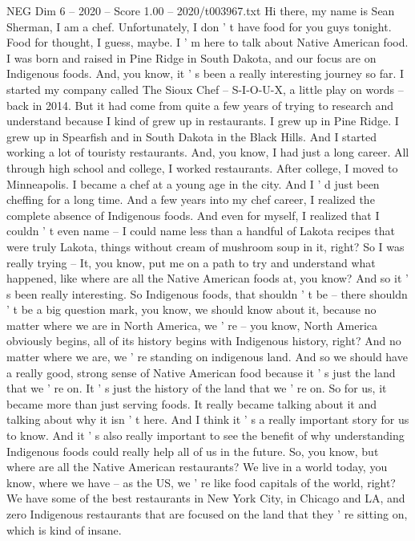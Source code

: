 \begin{textsample}{NEG Dim 6 – 2020 – Score 1.00 – 2020/t003967.txt}  \label{ex:f6_neg_024}
Hi there, my name is Sean Sherman, I am a chef.
Unfortunately, I don ' t have food for you guys tonight.
Food for thought, I guess, maybe.
I ' m here to talk about Native American food.
I was born and raised in Pine Ridge in South Dakota, and our focus are on Indigenous foods.
And, you know, it ' s been a really interesting journey so far.
I started my company called The Sioux Chef -- S-I-O-U-X, a little play on words -- back in 2014.
But it had come from quite a few years of trying to research and understand because I kind of grew up in restaurants.
I grew up in Pine Ridge.
I grew up in Spearfish and in South Dakota in the Black Hills.
And I started working a lot of touristy restaurants.
And, you know, I had just a long career.
All through high school and college, I worked restaurants.
After college, I moved to Minneapolis.
I became a chef at a young age in the city.
And I ' d just been cheffing for a long time.
And a few years into my chef career, I realized the complete absence of Indigenous foods.
And even for myself, I realized that I couldn ' t even name -- I could name less than a handful of Lakota recipes that were truly Lakota, things without cream of mushroom soup in it, right?
So I was really trying -- It, you know, put me on a path to try and understand what happened, like where are all the Native American foods at, you know?
And so it ' s been really interesting.
So Indigenous foods, that shouldn ' t be -- there shouldn ' t be a big question mark, you know, we should know about it, because no matter where we are in North America, we ' re -- you know, North America obviously begins, all of its history begins with Indigenous history, right?
And no matter where we are, we ' re standing on indigenous land.
And so we should have a really good, strong sense of Native American food because it ' s just the land that we ' re on.
It ' s just the history of the land that we ' re on.
So for us, it became more than just serving foods.
It really became talking about it and talking about why it isn ' t here.
And I think it ' s a really important story for us to know.
And it ' s also really important to see the benefit of why understanding Indigenous foods could really help all of us in the future.
So, you know, but where are all the Native American restaurants?
We live in a world today, you know, where we have -- as the US, we ' re like food capitals of the world, right?
We have some of the best restaurants in New York City, in Chicago and LA, and zero Indigenous restaurants that are focused on the land that they ' re sitting on, which is kind of insane.

\end{textsample}
